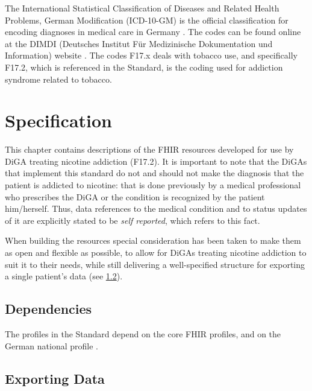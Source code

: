 \documentclass[12px]{report}
\newcommand{\fhir}{FHIR\textsuperscript{\textregistered}}
\begin{document}
The International Statistical Classification of Diseases and Related Health Problems, German Modification (ICD-10-GM) is the official classification for encoding diagnoses in medical care in Germany \cite{icd}.
The codes can be found online at the DIMDI (Deutsches Institut Für Medizinische Dokumentation und Information) website \cite{dimdi}. The codes F17.x deals with tobacco use, and specifically F17.2, which is referenced in the Standard,
is the coding used for addiction syndrome related to tobacco.


\chapter{Specification}
\label{ch:spec}

This chapter contains descriptions of the FHIR resources developed for use by DiGA treating nicotine addiction (F17.2). It is important to note that the DiGAs that implement this standard do not and should not
make the diagnosis that the patient is addicted to nicotine: that is done previously by a medical professional who prescribes the DiGA or the condition is recognized by the patient him/herself. 
Thus, data references to the medical condition and to status updates of it are explicitly stated to be \textit{self reported}, which refers to this fact.

When building the resources special consideration has been taken to make them as open and flexible as possible, to allow for DiGAs treating nicotine addiction to suit it to their needs, while still delivering a
well-specified structure for exporting a single patient's data (see \ref{sec:export}).


\section{Dependencies}

The profiles in the Standard depend on the core \fhir \cite{FHIR} profiles, and on the German national profile \cite{debasis}.

\section{Exporting Data}
\label{sec:export}
\end{document}

